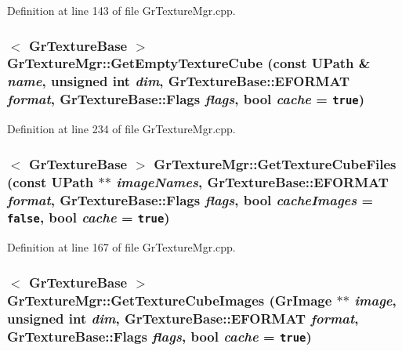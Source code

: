 Definition at line 143 of file GrTextureMgr.cpp.\hypertarget{class_gr_texture_mgr_801ca4868a8d15dc00e0d37153596f5c}{
\subsubsection[{GetEmptyTextureCube}]{$<$ {\bf GrTextureBase} $>$ GrTextureMgr::GetEmptyTextureCube (const {\bf UPath} \& {\em name}, \/  unsigned int {\em dim}, \/  {\bf GrTextureBase::EFORMAT} {\em format}, \/  {\bf GrTextureBase::Flags} {\em flags}, \/  bool {\em cache} = {\tt true})}}
\label{class_gr_texture_mgr_801ca4868a8d15dc00e0d37153596f5c}




Definition at line 234 of file GrTextureMgr.cpp.\hypertarget{class_gr_texture_mgr_cce335f8def2910986ab5b7b2e4a02c6}{
\subsubsection[{GetTextureCubeFiles}]{$<$ {\bf GrTextureBase} $>$ GrTextureMgr::GetTextureCubeFiles (const {\bf UPath} $\ast$$\ast$ {\em imageNames}, \/  {\bf GrTextureBase::EFORMAT} {\em format}, \/  {\bf GrTextureBase::Flags} {\em flags}, \/  bool {\em cacheImages} = {\tt false}, \/  bool {\em cache} = {\tt true})}}
\label{class_gr_texture_mgr_cce335f8def2910986ab5b7b2e4a02c6}




Definition at line 167 of file GrTextureMgr.cpp.\hypertarget{class_gr_texture_mgr_23e061dceb24e232264beef4ad1de42b}{
\subsubsection[{GetTextureCubeImages}]{$<$ {\bf GrTextureBase} $>$ GrTextureMgr::GetTextureCubeImages ({\bf GrImage} $\ast$$\ast$ {\em image}, \/  unsigned int {\em dim}, \/  {\bf GrTextureBase::EFORMAT} {\em format}, \/  {\bf GrTextureBase::Flags} {\em flags}, \/  bool {\em cache} = {\tt true})}}
\label{class_gr_texture_mgr_23e061dceb24e232264beef4ad1de42b}




